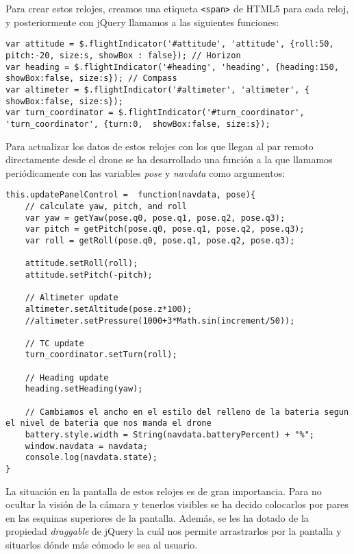 Para crear estos relojes, creamos una etiqueta \texttt{<span>} de HTML5 para cada reloj, y posteriormente con jQuery llamamos a las siguientes funciones:\\

\begin{lstlisting}[caption=Creación de los relojes.]
var attitude = $.flightIndicator('#attitude', 'attitude', {roll:50, pitch:-20, size:s, showBox : false}); // Horizon
var heading = $.flightIndicator('#heading', 'heading', {heading:150, showBox:false, size:s}); // Compass
var altimeter = $.flightIndicator('#altimeter', 'altimeter', { showBox:false, size:s});
var turn_coordinator = $.flightIndicator('#turn_coordinator', 'turn_coordinator', {turn:0,  showBox:false, size:s}); 
\end{lstlisting}

Para actualizar los datos de estos relojes con los que llegan al par remoto directamente desde el drone se ha desarrollado una función a la que llamamos periódicamente con las variables \emph{pose} y \emph{navdata} como argumentos:\\

\begin{lstlisting}[caption=Actualización de los relojes.]
this.updatePanelControl =  function(navdata, pose){
    // calculate yaw, pitch, and roll
    var yaw = getYaw(pose.q0, pose.q1, pose.q2, pose.q3);
    var pitch = getPitch(pose.q0, pose.q1, pose.q2, pose.q3);
    var roll = getRoll(pose.q0, pose.q1, pose.q2, pose.q3);
    
    attitude.setRoll(roll);
    attitude.setPitch(-pitch);

    // Altimeter update
    altimeter.setAltitude(pose.z*100);
    //altimeter.setPressure(1000+3*Math.sin(increment/50));

    // TC update
    turn_coordinator.setTurn(roll);

    // Heading update
    heading.setHeading(yaw);
    
    // Cambiamos el ancho en el estilo del relleno de la bateria segun el nivel de bateria que nos manda el drone
    battery.style.width = String(navdata.batteryPercent) + "%";
    window.navdata = navdata;
    console.log(navdata.state);
}
\end{lstlisting}

La situación en la pantalla de estos relojes es de gran importancia. Para no ocultar la visión de la cámara y tenerlos visibles se ha decido colocarlos por pares en las esquinas superiores de la pantalla. Además, se les ha dotado de la propiedad \emph{draggable} de jQuery la cuál nos permite arrastrarlos por la pantalla y situarlos dónde más cómodo le sea al usuario.\\


